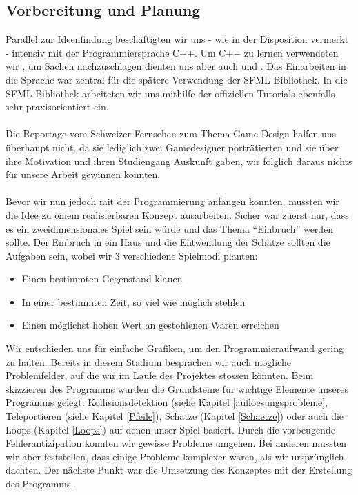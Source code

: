 \documentclass[11pt,a4paper]{scrbook}
\newcommand{\q}[1]{``#1''}
\begin{document}
\subsection{Vorbereitung und Planung}
Parallel zur Ideenfindung beschäftigten wir uns - wie in der
Disposition vermerkt - intensiv mit der Programmiersprache C++. Um C++ zu lernen verwendeten wir \cite{cpp_grundkurs}, um Sachen nachzuschlagen dienten uns aber auch \cite{cpp_referenz} und \cite{cpp_com}. Das Einarbeiten in die Sprache war zentral für die spätere Verwendung der SFML-Bibliothek. In die SFML Bibliothek arbeiteten wir uns mithilfe der offiziellen Tutorials \cite{sfml_tutorials} ebenfalls sehr praxisorientiert ein.\\
\\
Die Reportage vom Schweizer Fernsehen \cite{sf_gamedesign} zum Thema Game Design halfen uns überhaupt nicht, da sie lediglich zwei Gamedesigner porträtierten und sie über ihre Motivation und ihren Studiengang Auskunft gaben, wir folglich daraus nichts für unsere Arbeit gewinnen konnten.\\
\\
Bevor wir nun jedoch mit der Programmierung anfangen konnten, mussten wir die Idee zu einem realisierbaren Konzept ausarbeiten.
Sicher war zuerst nur, dass es ein zweidimensionales Spiel sein würde und das Thema \q{Einbruch} werden sollte.
Der Einbruch in ein Haus und die Entwendung der Schätze sollten die Aufgaben sein, wobei wir 3 verschiedene Spielmodi planten:
\begin{itemize}
\item Einen bestimmten Gegenstand klauen
\item In einer bestimmten Zeit, so viel wie möglich stehlen
\item Einen möglichst hohen Wert an gestohlenen Waren erreichen
\end{itemize}
Wir entschieden uns für einfache Grafiken, um den Programmieraufwand gering zu halten. 
Bereits in diesem Stadium besprachen wir auch mögliche Problemfelder, auf die wir im Laufe des Projektes stossen könnten.
Beim skizzieren des Programms wurden die Grundsteine für wichtige Elemente unseres Programms gelegt: Kollisionsdetektion (siehe Kapitel \ref{aufloesungsprobleme}, Teleportieren (siehe Kapitel \ref{Pfeile}), Schätze (Kapitel \ref{Schaetze}) oder auch die Loops (Kapitel \ref{Loops}) auf denen unser Spiel basiert.
Durch die vorbeugende Fehlerantizipation konnten wir gewisse Probleme umgehen. Bei anderen mussten wir aber feststellen, dass einige Probleme komplexer waren, als wir ursprünglich dachten.
Der nächste Punkt war die Umsetzung des Konzeptes mit der Erstellung des Programms.
\end{document}
